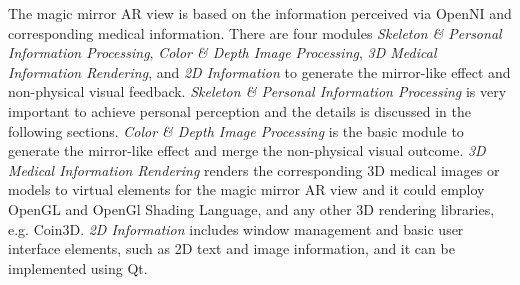 The magic mirror AR view is based on the information perceived via OpenNI and corresponding medical information. There are four modules \textit{Skeleton \& Personal Information Processing}, \textit{Color \& Depth Image Processing}, \textit{3D Medical Information Rendering}, and \textit{2D Information} to generate the mirror-like effect and non-physical visual feedback. \textit{Skeleton \& Personal Information Processing} is very important to achieve personal perception and the details is discussed in the following sections. \textit{Color \& Depth Image Processing} is the basic module to generate the mirror-like effect and merge the non-physical visual outcome. \textit{3D Medical Information Rendering} renders the corresponding 3D medical images or models to virtual elements for the magic mirror AR view and it could employ OpenGL and OpenGl Shading Language, and any other 3D rendering libraries, e.g. Coin3D. \textit{2D Information} includes window management and basic user interface elements, such as 2D text and image information, and it can be implemented using Qt.

